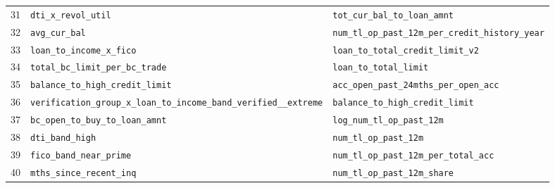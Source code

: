 \documentclass[final,5p,twocolumn]{elsarticle}
\begin{document}
\begin{table}[htbp]
\begin{threeparttable}
\begin{tabular}{@{}rL{80mm}L{80mm}@{}}
31 & \texttt{dti\_\allowbreak x\_\allowbreak revol\_\allowbreak util} & \texttt{tot\_\allowbreak cur\_\allowbreak bal\_\allowbreak to\_\allowbreak loan\_\allowbreak amnt} \\
32 & \texttt{avg\_\allowbreak cur\_\allowbreak bal} & \texttt{num\_\allowbreak tl\_\allowbreak op\_\allowbreak past\_\allowbreak 12m\_\allowbreak per\_\allowbreak credit\_\allowbreak history\_\allowbreak year} \\
33 & \texttt{loan\_\allowbreak to\_\allowbreak income\_\allowbreak x\_\allowbreak fico} & \texttt{loan\_\allowbreak to\_\allowbreak total\_\allowbreak credit\_\allowbreak limit\_\allowbreak v2} \\
34 & \texttt{total\_\allowbreak bc\_\allowbreak limit\_\allowbreak per\_\allowbreak bc\_\allowbreak trade} & \texttt{loan\_\allowbreak to\_\allowbreak total\_\allowbreak limit} \\
35 & \texttt{balance\_\allowbreak to\_\allowbreak high\_\allowbreak credit\_\allowbreak limit} & \texttt{acc\_\allowbreak open\_\allowbreak past\_\allowbreak 24mths\_\allowbreak per\_\allowbreak open\_\allowbreak acc} \\
36 & \texttt{verification\_\allowbreak group\_\allowbreak x\_\allowbreak loan\_\allowbreak to\_\allowbreak income\_\allowbreak band\_\allowbreak verified\_\allowbreak \_\allowbreak extreme} & \texttt{balance\_\allowbreak to\_\allowbreak high\_\allowbreak credit\_\allowbreak limit} \\
37 & \texttt{bc\_\allowbreak open\_\allowbreak to\_\allowbreak buy\_\allowbreak to\_\allowbreak loan\_\allowbreak amnt} & \texttt{log\_\allowbreak num\_\allowbreak tl\_\allowbreak op\_\allowbreak past\_\allowbreak 12m} \\
38 & \texttt{dti\_\allowbreak band\_\allowbreak high} & \texttt{num\_\allowbreak tl\_\allowbreak op\_\allowbreak past\_\allowbreak 12m} \\
39 & \texttt{fico\_\allowbreak band\_\allowbreak near\_\allowbreak prime} & \texttt{num\_\allowbreak tl\_\allowbreak op\_\allowbreak past\_\allowbreak 12m\_\allowbreak per\_\allowbreak total\_\allowbreak acc} \\
40 & \texttt{mths\_\allowbreak since\_\allowbreak recent\_\allowbreak inq} & \texttt{num\_\allowbreak tl\_\allowbreak op\_\allowbreak past\_\allowbreak 12m\_\allowbreak share} \\
\bottomrule
\end{tabular}
\end{threeparttable}
\end{table}
\end{document}
